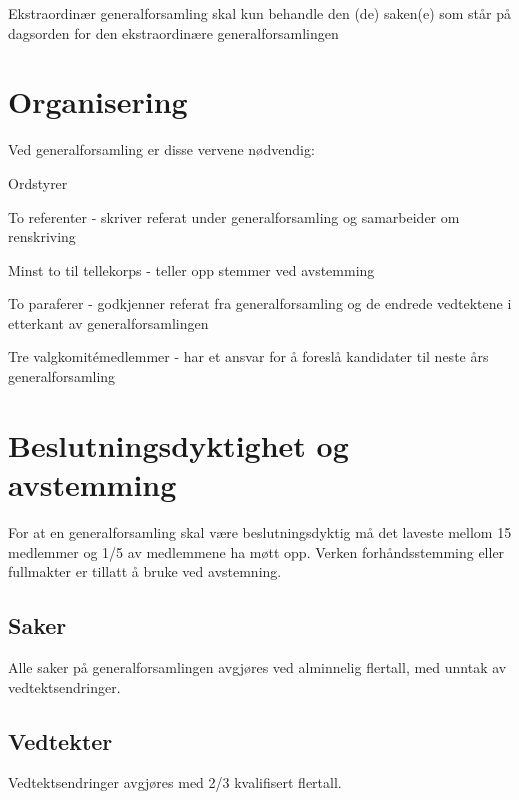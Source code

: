 Ekstraordinær generalforsamling skal kun behandle den (de) saken(e) som står på dagsorden for den ekstraordinære generalforsamlingen
 

\section{Organisering} \label{sec:organisering}
\vspace{23pt}
Ved generalforsamling er disse vervene nødvendig: 

\begin{liste}
	\item Ordstyrer
	\item To referenter - skriver referat under generalforsamling og samarbeider om \mbox{renskriving}
	\item Minst to til tellekorps - teller opp stemmer ved avstemming
	\item To paraferer - godkjenner referat fra generalforsamling og de endrede vedtektene i etterkant av generalforsamlingen
	\item Tre valgkomitémedlemmer - har et ansvar for å foreslå kandidater til neste års generalforsamling
	
\end{liste}

\newpage
\section{Beslutningsdyktighet og avstemming}
\vspace{23pt}

For at en generalforsamling skal være beslutningsdyktig må det laveste mellom 15 medlemmer og 1/5 av medlemmene ha møtt opp.\newline
Verken forhåndsstemming eller fullmakter er tillatt å bruke ved avstemning.

\subsection{Saker}

Alle saker på generalforsamlingen avgjøres ved alminnelig flertall, med unntak av vedtektsendringer. 

\subsection{Vedtekter}

Vedtektsendringer avgjøres med 2/3 kvalifisert flertall. 




